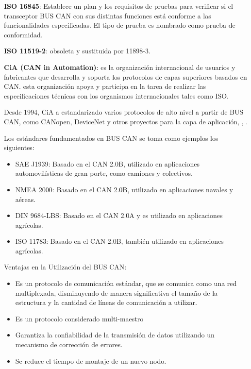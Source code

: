 \textbf{ISO 16845}: Establece un plan  y los requisitos de pruebas para verificar si el transceptor BUS CAN con sus distintas funciones está conforme  a las funcionalidades especificadas. El tipo de prueba es nombrado como prueba de conformidad. 

\textbf{ISO 11519-2}: obsoleta y sustituida por 11898-3. 

\textbf{CiA (CAN in Automation)}:  es la organización internacional de usuarios y fabricantes que desarrolla y soporta los protocolos de capas superiores basados en CAN.
esta organización apoya y participa en la tarea de realizar las especificaciones técnicas con los organismos internacionales tales como ISO. 

Desde 1994, CiA a estandarizado varios protocolos de alto nivel a partir de BUS CAN, como CANopen, DeviceNet y otros proyectos para la capa de aplicación, \cite{NI}, \cite{CIA}.




Los estándares fundamentados en BUS CAN se toma como ejemplos los siguientes:

\begin {itemize}
\item SAE J1939: Basado en el CAN 2.0B, utilizado en aplicaciones automovilísticas de gran porte, como camiones y colectivos.
\item NMEA 2000: Basado en el CAN 2.0B, utilizado en aplicaciones navales y aéreas.
\item DIN 9684-LBS: Basado en el CAN 2.0A y es utilizado en aplicaciones agrícolas.
\item ISO 11783: Basado en el CAN 2.0B, también utilizado en aplicaciones agrícolas.
\end{itemize}

Ventajas en la Utilización del  BUS CAN:

\begin {itemize}
\item Es un protocolo de comunicación estándar, que se comunica como una red multiplexada, disminuyendo de manera significativa el tamaño de la estructura y la cantidad de líneas de comunicación a utilizar.
\item Es un protocolo considerado multi-maestro
\item Garantiza la confiabilidad de la transmisión de datos utilizando un mecanismo de corrección de errores.
\item Se reduce el tiempo de montaje de un nuevo nodo.
\end {itemize}

